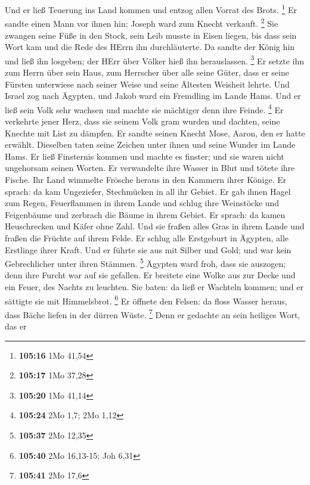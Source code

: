  Und er ließ Teuerung ins Land kommen und entzog allen
Vorrat des Brots. \footnote{\textbf{105:16} 1Mo 41,54}  Er
sandte einen Mann vor ihnen hin; Joseph ward zum Knecht verkauft.
\footnote{\textbf{105:17} 1Mo 37,28}  Sie zwangen seine
Füße in den Stock, sein Leib musste in Eisen liegen,  bis
dass sein Wort kam und die Rede des HErrn ihn durchläuterte.
 Da sandte der König hin und ließ ihn losgeben; der HErr
über Völker hieß ihn herauslassen. \footnote{\textbf{105:20} 1Mo 41,14}
 Er setzte ihn zum Herrn über sein Haus, zum Herrscher über
alle seine Güter,  dass er seine Fürsten unterwiese nach
seiner Weise und seine Ältesten Weisheit lehrte.  Und
Israel zog nach Ägypten, und Jakob ward ein Fremdling im Lande Hams.
 Und er ließ sein Volk sehr wachsen und machte sie
mächtiger denn ihre Feinde. \footnote{\textbf{105:24} 2Mo 1,7; 2Mo 1,12}
 Er verkehrte jener Herz, dass sie seinem Volk gram wurden
und dachten, seine Knechte mit List zu dämpfen.  Er sandte
seinen Knecht Mose, Aaron, den er hatte erwählt.  Dieselben
taten seine Zeichen unter ihnen und seine Wunder im Lande Hams.
 Er ließ Finsternis kommen und machte es finster; und sie
waren nicht ungehorsam seinen Worten.  Er verwandelte ihre
Wasser in Blut und tötete ihre Fische.  Ihr Land wimmelte
Frösche heraus in den Kammern ihrer Könige.  Er sprach: da
kam Ungeziefer, Stechmücken in all ihr Gebiet.  Er gab
ihnen Hagel zum Regen, Feuerflammen in ihrem Lande  und
schlug ihre Weinstöcke und Feigenbäume und zerbrach die Bäume in ihrem
Gebiet.  Er sprach: da kamen Heuschrecken und Käfer ohne
Zahl.  Und sie fraßen alles Gras in ihrem Lande und fraßen
die Früchte auf ihrem Felde.  Er schlug alle Erstgeburt in
Ägypten, alle Erstlinge ihrer Kraft.  Und er führte sie aus
mit Silber und Gold; und war kein Gebrechlicher unter ihren Stämmen.
\footnote{\textbf{105:37} 2Mo 12,35}  Ägypten ward froh,
dass sie auszogen; denn ihre Furcht war auf sie gefallen. 
Er breitete eine Wolke aus zur Decke und ein Feuer, des Nachts zu
leuchten.  Sie baten: da ließ er Wachteln kommen; und er
sättigte sie mit Himmelsbrot. \footnote{\textbf{105:40} 2Mo 16,13-15;
  Joh 6,31}  Er öffnete den Felsen: da floss Wasser heraus,
dass Bäche liefen in der dürren Wüste. \footnote{\textbf{105:41} 2Mo
  17,6}  Denn er gedachte an sein heiliges Wort, das er
